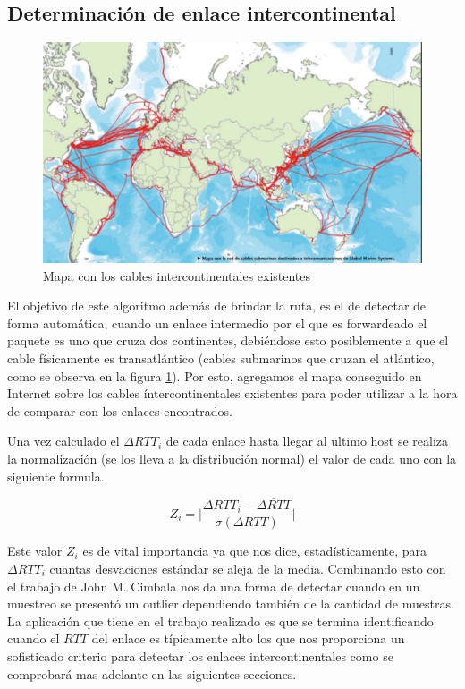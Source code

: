 \clearpage

\subsection{Determinación de enlace intercontinental}

\begin{figure}[ht]
	\begin{center}
		\includegraphics[width=0.6\columnwidth]{imagenes/mapa-transcontinental.png}
		\caption{Mapa con los cables intercontinentales existentes}
		\label{fig:cables_intercontinentales}
	\end{center}
\end{figure}

El objetivo de este algoritmo además de brindar la ruta, es el de detectar de
forma automática, cuando un enlace intermedio por el que es forwardeado el
paquete es uno que cruza dos continentes, debiéndose esto posiblemente a
que el cable físicamente es transatlántico (cables submarinos que cruzan el
atlántico, como se observa en la figura \ref{fig:cables_intercontinentales}). Por esto, agregamos el mapa conseguido en Internet sobre los cables
íntercontinentales existentes para poder utilizar a la hora de comparar con
los enlaces encontrados.

Una vez calculado el $\Delta RTT_{i}$ de cada enlace hasta llegar
al ultimo host se realiza la normalización (se los lleva a la distribución normal)
el valor de cada uno con la siguiente formula.

\begin{equation}\label{eq:z}
	Z_{i} = \lvert\frac{\Delta RTT_{i} - \overline{\Delta RTT}}{\sigma \left(\Delta RTT \right)}\rvert
\end{equation}

Este valor $Z_{i}$ es de vital importancia ya que nos dice, estadísticamente,
para $\Delta RTT_{i}$ cuantas desvaciones estándar se aleja de la media.
Combinando esto con el trabajo de John M. Cimbala\cite{cimbala} nos da una forma de
detectar cuando en un muestreo se presentó un outlier dependiendo también de la
cantidad de muestras. La aplicación que tiene en el trabajo realizado es que se
termina identificando cuando el $RTT$ del enlace es típicamente alto los que nos
proporciona un sofisticado criterio para detectar los enlaces
intercontinentales como se comprobará mas adelante en las siguientes secciones.
